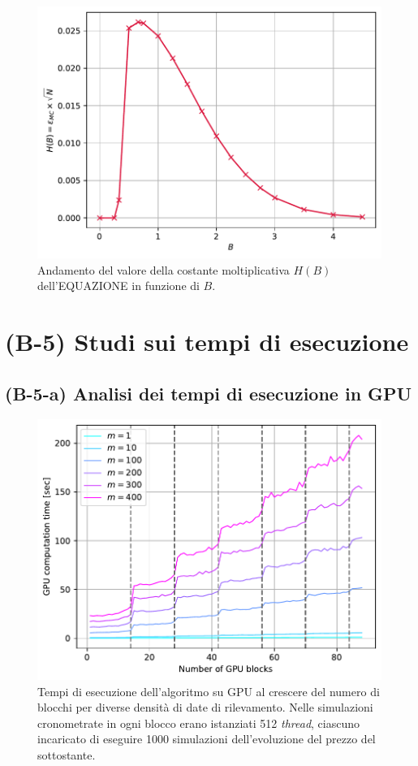 \begin{figure}[t]
    \centering
    \includegraphics[scale=0.5]{graphs/OptionPriceVsB_HBVsB.pdf}
    \caption{Andamento del valore della costante moltiplicativa $H(B)$ dell'EQUAZIONE in funzione di $B$.}
    \label{fig:HB_vs_B}
\end{figure}

\lipsum[1-3]


\section{(B-5) Studi sui tempi di esecuzione} \label{sec:comptime}
\subsection{(B-5-a) Analisi dei tempi di esecuzione in GPU}
\begin{figure}[t]
    \centering
    \includegraphics[scale=0.5]{graphs/ComputationTime_Tesla_GPUTimeVsNOfBlocks_VariousM_1000SimsPerThread.pdf}
    \caption{Tempi di esecuzione dell'algoritmo su GPU al crescere del numero di blocchi per diverse densità di date di rilevamento. Nelle simulazioni cronometrate in ogni blocco erano istanziati 512 \textit{thread}, ciascuno incaricato di eseguire 1000 simulazioni dell'evoluzione del prezzo del sottostante.}
    \label{fig:gpucomptime}
\end{figure}
\lipsum[1-3]

